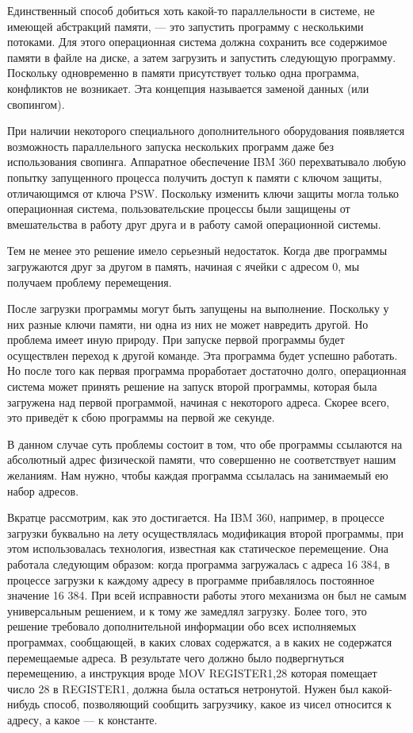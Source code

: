\documentclass[a4paper,12pt]{extarticle}
\begin{document}
Единственный способ добиться хоть какой-то параллельности в системе, не имеющей абстракций памяти, — это запустить программу с несколькими потоками. Для этого операционная система должна сохранить все содержимое памяти в файле на диске, а затем загрузить и запустить следующую программу. Поскольку одновременно в памяти присутствует только одна программа, конфликтов не возникает. Эта концепция называется заменой данных (или свопингом).

При наличии некоторого специального дополнительного оборудования появляется возможность параллельного запуска нескольких программ даже без использования свопинга. Аппаратное обеспечение IBM 360 перехватывало любую попытку запущенного процесса получить доступ к памяти с ключом защиты, отличающимся от ключа PSW. Поскольку изменить ключи защиты могла только операционная система, пользовательские процессы были защищены от вмешательства в работу друг друга и в работу самой операционной системы.

Тем не менее это решение имело серьезный недостаток. Когда две программы загружаются друг за другом в память, начиная с ячейки с адресом 0, мы получаем проблему перемещения.

После загрузки программы могут быть запущены на выполнение. Поскольку у них разные ключи памяти, ни одна из них не может навредить другой. Но проблема имеет иную природу. При запуске первой программы будет осуществлен переход к другой команде. Эта программа будет успешно работать. Но после того как первая программа проработает достаточно долго, операционная система может принять решение на запуск второй программы, которая была загружена над первой программой, начиная с некоторого адреса. Скорее всего, это приведёт к сбою программы на первой же секунде.

В данном случае суть проблемы состоит в том, что обе программы ссылаются на абсолютный адрес физической памяти, что совершенно не соответствует нашим желаниям. Нам нужно, чтобы каждая программа ссылалась на занимаемый ею набор адресов.

Вкратце рассмотрим, как это достигается. На IBM 360, например, в процессе загрузки буквально на лету осуществлялась модификация второй программы, при этом использовалась технология, известная как статическое перемещение. Она работала следующим образом: когда программа загружалась с адреса 16 384, в процессе загрузки к каждому адресу в программе прибавлялось постоянное значение 16 384. При всей исправности работы этого механизма он был не самым универсальным решением, и к тому же замедлял загрузку. Более того, это решение требовало дополнительной информации обо всех исполняемых программах, сообщающей, в каких словах содержатся, а в каких не содержатся перемещаемые адреса. В результате чего должно было подвергнуться перемещению, а инструкция вроде
\newline MOV REGISTER1,28
\newline которая помещает число 28 в REGISTER1, должна была остаться нетронутой. Нужен был какой-нибудь способ, позволяющий сообщить загрузчику, какое из чисел относится к адресу, а какое — к константе.
\newpage
\end{document}
